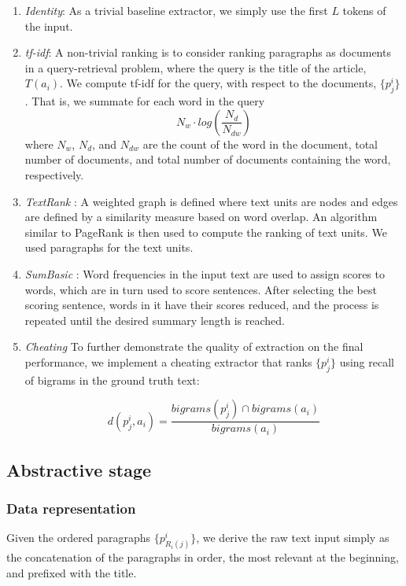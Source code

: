 \begin{enumerate}
    \item \textit{Identity}: As a trivial baseline extractor, we simply use the first $L$ tokens of the input.
\item \textit{tf-idf}: A non-trivial ranking is to consider ranking paragraphs as documents in a query-retrieval
problem, where the query is the title of the article, $T(a_i)$. We compute tf-idf \citep{ramos2003using}
for the query, with respect to the documents, $\{p^i_j\}$. That is, we summate
for each word in the query
\[N_w \cdot log (\frac{N_d}{N_{dw}}) \]
where $N_w$, $N_d$, and $N_{dw}$ are the count of the word in the document,
total number of documents, and total number of documents containing the word, 
respectively.

\item \textit{TextRank} \citep{textrank}: A weighted graph is defined
	where text units are nodes and edges are defined
		by a similarity measure based on word overlap.
	An algorithm similar to PageRank \citep{pagerank} is then used to
	compute the ranking of text units. We used paragraphs for the text units.
\item \textit{SumBasic} \citep{sumbasic}: Word frequencies in the input text
	are used to assign scores to words, which are in turn used to score
        sentences. After selecting the best scoring sentence, words in it
        have their scores reduced, and the process is repeated until the desired
	summary length is reached.

\item \textit{Cheating}
    To further demonstrate the quality of extraction on the final performance,
    we implement a cheating extractor that ranks $\{p^i_j\}$ using recall of bigrams
    in the ground truth text:

\begin{equation}
d(p^i_j, a_i) = \frac{bigrams(p^i_j) \cap bigrams(a_i)}{bigrams(a_i)}
\label{cheating-similarity}
\end{equation}
\end{enumerate}


\subsection{Abstractive stage}
\subsubsection{Data representation}
Given the ordered paragraphs $\{p^i_{R_i(j)}\}$,
we derive the raw text input simply as the concatenation of the paragraphs in
order,
the most relevant at the beginning, and prefixed with the title.

